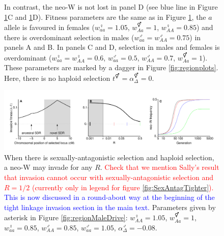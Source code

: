 \documentclass[12pt]{article}
\begin{document}
\begin{figure}[!h]
{In contrast, the neo-W is not lost in panel D (see blue line in Figure \ref{fig:temporalOverdominance}C and  \ref{fig:temporalOverdominance}D). 
Fitness parameters are the same as in Figure \ref{fig:temporalOverdominance}, the $a$ allele is favoured in females ($w_{aa}^\female=1.05$, $w_{Aa}^\Hermaphrodite=1$, $w_{AA}^\female=0.85$) and there is overdominant selection in males ($w_{aa}^\male=w_{AA}^\male=0.75$) in panels A and B.
In panels C and D, selection in males and females is overdominant ($w_{aa}^\female=w_{AA}^\female=0.6$, $w_{aa}^\male=0.5$, $w_{AA}^\male=0.7$, $w_{Aa}^\Hermaphrodite=1$). 
These parameters are marked by a dagger in Figure \ref{fig:regionplots}. 
Here, there is no haploid selection $t^\Hermaphrodite = \alpha^\Hermaphrodite_\Delta = 0$.
}
\label{fig:temporalOverdominance}
\end{figure}

\begin{figure}[!h]
\centering
\centerline{\includegraphics[width=1.5\linewidth]{PositionPlot_SexAntagTighter_MaleDrive_Mike}}
\caption{
When there is sexually-antagonistic selection and haploid selection, a neo-W may invade for any $R$.
\textcolor{red}{
Check that we mention Sally's result that invasion cannot occur with sexually-antagonistic selection and $R=1/2$ (currently only in legend for figure \ref{fig:SexAntagTighter}). 
}
\textcolor{blue}{This is now discussed in a round-about way at the beginning of the tight linkage invasion section in the main text. }
Parameters given by asterisk in Figure \ref{fig:regionMaleDrive}: $w_{AA}^\female=1.05$, $w_{Aa}^\Hermaphrodite=1$, $w_{aa}^\female=0.85$, $w_{AA}^\male=0.85$, $w_{aa}^\male=1.05$, $\alpha_{\Delta}^\male=-0.08$.
}
\label{fig:SexAntagTighterMaleDrive}
\end{figure}
\end{document}
